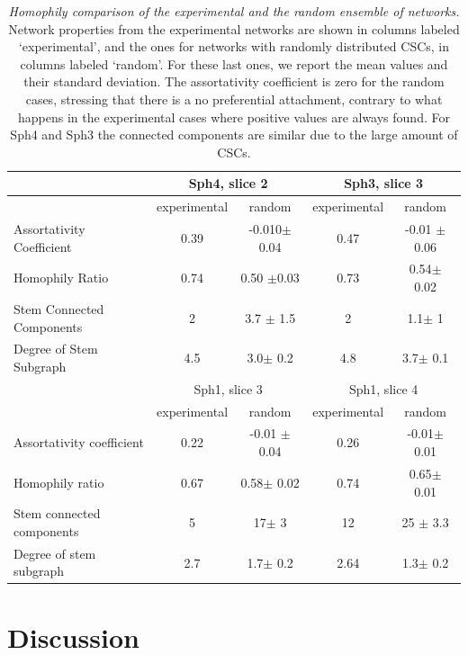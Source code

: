 \documentclass[fleqn,10pt]{wlscirep}
\begin{document}
\begin{table}[htbp]
\centering
\begin{tabular}{|l|c|c|c|c|}
\hline
 & \multicolumn{2}{|c|}{\textsf{ Sph4, slice 2}}  &  \multicolumn{2}{|c|}{\textsf{ Sph3, slice 3}}\\
\hline
 &experimental &random& experimental & random\\
\hline
Assortativity Coefficient &
0.39 & -0.010$\pm$ 0.04& 0.47 & -0.01 $\pm$ 0.06 \\
\hline
Homophily Ratio &  0.74&0.50 $\pm$0.03&0.73&  0.54$\pm$  0.02  \\
\hline
Stem Connected Components &2& 3.7 $\pm$ 1.5 &2&  1.1$\pm$  1 \\
\hline
Degree of Stem Subgraph &4.5& 3.0$\pm$ 0.2  &4.8& 3.7$\pm$ 0.1\\
\hline
\hline
\hline
 & \multicolumn{2}{|c|}{\textsf{ Sph1, slice 3}} & \multicolumn{2}{|c|}{\textsf{ Sph1, slice 4}}  \\
\hline
 & experimental & random& experimental&random \\
\hline
Assortativity coefficient &0.22 & -0.01 $\pm$ 0.04   &0.26& -0.01$\pm$ 0.01  \\
\hline
Homophily ratio  &0.67& 0.58$\pm$ 0.02 &0.74& 0.65$\pm$  0.01 \\
\hline
Stem connected components &5& 17$\pm$ 3 &12& 25 $\pm$ 3.3 \\
\hline
Degree of stem subgraph &2.7& 1.7$\pm$ 0.2 & 2.64 & 1.3$\pm$ 0.2  \\
\hline

\end{tabular}
\caption{\emph{Homophily comparison of the experimental and the random ensemble of networks.} Network properties from the experimental networks are shown in columns labeled `experimental', and the ones for networks with randomly distributed CSCs, in columns labeled `random'. For these last ones, we report the mean values and their standard deviation. The assortativity coefficient is zero for the random cases, stressing that there is a no preferential attachment, contrary to what happens in the experimental cases where positive values are always found. For \textsf{ Sph4} and \textsf{ Sph3} the connected components are similar due to the large amount of CSCs. }
\label{tab: ensemble statistics}
\end{table}


\section*{Discussion}
\end{document}
